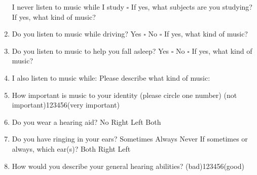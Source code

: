 \documentclass[12pt, a4paper]{article}
\begin{document}
\begin{enumerate}
\newline I never listen to music while I study $\square$
\newline If yes, what subjects are you studying? \hrulefill
\newline If yes, what kind of music? \hrulefill
\item Do you listen to music while driving?  \hspace{12pt} Yes $\square$ No $\square$
\newline If yes, what kind of music? \hrulefill
\item Do you listen to music to help you fall asleep?  \hspace{12pt} Yes $\square$ No $\square$
\newline If yes, what kind of music? \hrulefill
\item I also listen to music while: \hrulefill
\newline Please describe what kind of music: \hrulefill
\item How important is music to your identity (please circle one number)
\newline (not important)\hspace{12pt}1\hspace{12pt}2\hspace{12pt}3\hspace{12pt}4\hspace{12pt}5\hspace{12pt}6\hspace{12pt}(very important) 
\item Do you wear a hearing aid?\hspace{6pt} No \hspace{6pt} Right \hspace{6pt} Left \hspace{6pt} Both
\item Do you have ringing in your ears?\hspace{6pt} Sometimes \hspace{6pt} Always \hspace{6pt} Never \hspace{6pt}
\newline If sometimes or always, which ear(s)?\hspace{6pt} Both \hspace{6pt} Right \hspace{6pt} Left \hspace{6pt}
\item How would you describe your general hearing abilities?
\newline (bad)\hspace{12pt}1\hspace{12pt}2\hspace{12pt}3\hspace{12pt}4\hspace{12pt}5\hspace{12pt}6\hspace{12pt}(good) 

\end{enumerate}
\end{document}
